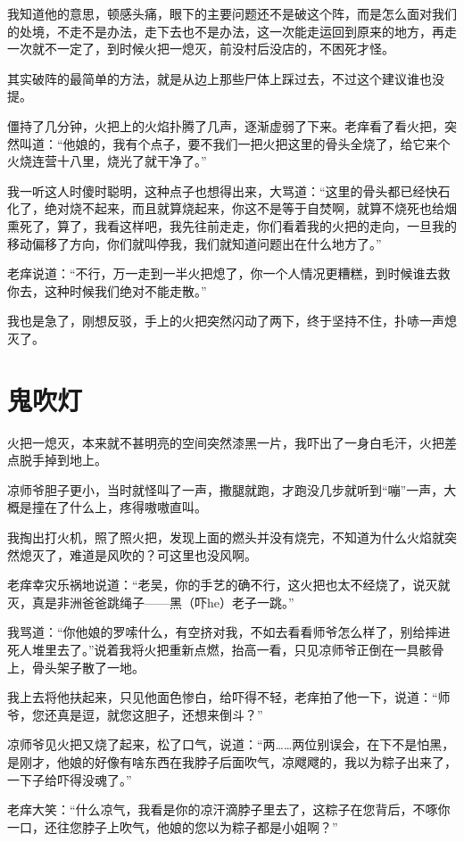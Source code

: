 我知道他的意思，顿感头痛，眼下的主要问题还不是破这个阵，而是怎么面对我们的处境，不走不是办法，走下去也不是办法，这一次能走运回到原来的地方，再走一次就不一定了，到时候火把一熄灭，前没村后没店的，不困死才怪。

其实破阵的最简单的方法，就是从边上那些尸体上踩过去，不过这个建议谁也没提。

僵持了几分钟，火把上的火焰扑腾了几声，逐渐虚弱了下来。老痒看了看火把，突然叫道：“他娘的，我有个点子，要不我们一把火把这里的骨头全烧了，给它来个火烧连营十八里，烧光了就干净了。”

我一听这人时傻时聪明，这种点子也想得出来，大骂道：“这里的骨头都已经快石化了，绝对烧不起来，而且就算烧起来，你这不是等于自焚啊，就算不烧死也给烟熏死了，算了，我看这样吧，我先往前走走，你们看着我的火把的走向，一旦我的移动偏移了方向，你们就叫停我，我们就知道问题出在什么地方了。”

老痒说道：“不行，万一走到一半火把熄了，你一个人情况更糟糕，到时候谁去救你去，这种时候我们绝对不能走散。”

我也是急了，刚想反驳，手上的火把突然闪动了两下，终于坚持不住，扑哧一声熄灭了。

\chapter{鬼吹灯}

火把一熄灭，本来就不甚明亮的空间突然漆黑一片，我吓出了一身白毛汗，火把差点脱手掉到地上。

凉师爷胆子更小，当时就怪叫了一声，撒腿就跑，才跑没几步就听到“嘣”一声，大概是撞在了什么上，疼得嗷嗷直叫。

我掏出打火机，照了照火把，发现上面的燃头并没有烧完，不知道为什么火焰就突然熄灭了，难道是风吹的？可这里也没风啊。

老痒幸灾乐祸地说道：“老吴，你的手艺的确不行，这火把也太不经烧了，说灭就灭，真是非洲爸爸跳绳子——黑（吓he）老子一跳。”

我骂道：“你他娘的罗嗦什么，有空挤对我，不如去看看师爷怎么样了，别给摔进死人堆里去了。”说着我将火把重新点燃，抬高一看，只见凉师爷正倒在一具骸骨上，骨头架子散了一地。

我上去将他扶起来，只见他面色惨白，给吓得不轻，老痒拍了他一下，说道：“师爷，您还真是逗，就您这胆子，还想来倒斗？”

凉师爷见火把又烧了起来，松了口气，说道：“两……两位别误会，在下不是怕黑，是刚才，他娘的好像有啥东西在我脖子后面吹气，凉飕飕的，我以为粽子出来了，一下子给吓得没魂了。”

老痒大笑：“什么凉气，我看是你的凉汗滴脖子里去了，这粽子在您背后，不啄你一口，还往您脖子上吹气，他娘的您以为粽子都是小姐啊？”

